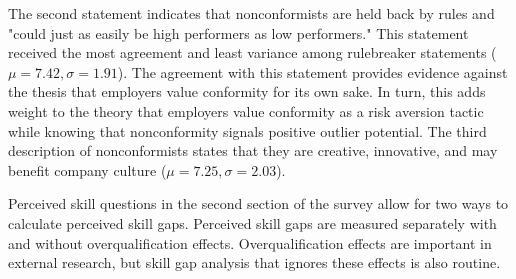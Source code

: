\documentclass[review]{elsarticle}
\begin{document}
The second statement indicates that nonconformists are held back by rules and "could just as easily be high performers as low performers."
This statement received the most agreement and least variance among rulebreaker statements ($\mu = 7.42, \sigma = 1.91$).
The agreement with this statement provides evidence against the thesis that employers value conformity for its own sake.
In turn, this adds weight to the theory that employers value conformity as a risk aversion tactic while knowing that nonconformity signals positive outlier potential.
The third description of nonconformists states that they are creative, innovative, and may benefit company culture ($\mu = 7.25, \sigma = 2.03$).


Perceived skill questions in the second section of the survey allow for two ways to calculate perceived skill gaps.
Perceived skill gaps are measured separately with and without overqualification effects.
Overqualification effects are important in external research\cite{green2007there, raybould2005over}, but skill gap analysis that ignores these effects is also routine\cite{blake_2018}.
\end{document}
